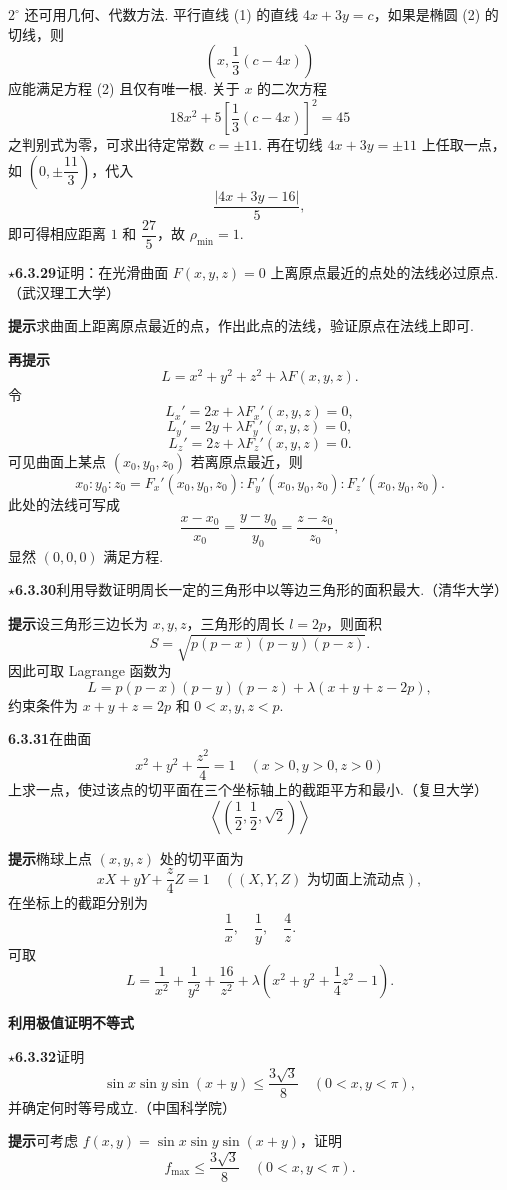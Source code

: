 \documentclass[UTF8,12pt,a4paper,fontset=fandol]{ctexart}
\begin{document}
$2^\circ$ 还可用几何、代数方法. 平行直线 (1) 的直线 $4x+3y=c$，如果是椭圆 (2) 的切线，则
\[
  \left(x,\frac13(c-4x)\right)
\]
应能满足方程 (2) 且仅有唯一根. 关于 $x$ 的二次方程
\[
  18x^2+5\left[\frac13(c-4x)\right]^2=45
\]
之判别式为零，可求出待定常数 $c=\pm11$. 再在切线 $4x+3y=\pm11$ 上任取一点，如 $\left(0,\pm\dfrac{11}{3}\right)$，代入
\[
  \frac{|4x+3y-16|}{5},
\]
即可得相应距离 $1$ 和 $\dfrac{27}{5}$，故 $\rho_{\min}=1$.

\noindent\textbf{\ensuremath{\star}6.3.29}\quad 证明：在光滑曲面 $F(x,y,z)=0$ 上离原点最近的点处的法线必过原点.（武汉理工大学）

\noindent\textbf{提示}\quad 求曲面上距离原点最近的点，作出此点的法线，验证原点在法线上即可.

\noindent\textbf{再提示}\quad
\[
  L=x^2+y^2+z^2+\lambda F(x,y,z).
\]
令
\[
  L_x'=2x+\lambda F_x'(x,y,z)=0,
\]
\[
  L_y'=2y+\lambda F_y'(x,y,z)=0,
\]
\[
  L_z'=2z+\lambda F_z'(x,y,z)=0.
\]
可见曲面上某点 $(x_0,y_0,z_0)$ 若离原点最近，则
\[
  x_0:y_0:z_0=F_x'(x_0,y_0,z_0):F_y'(x_0,y_0,z_0):F_z'(x_0,y_0,z_0).
\]
此处的法线可写成
\[
  \frac{x-x_0}{x_0}=\frac{y-y_0}{y_0}=\frac{z-z_0}{z_0},
\]
显然 $(0,0,0)$ 满足方程.

\noindent\textbf{\ensuremath{\star}6.3.30}\quad 利用导数证明周长一定的三角形中以等边三角形的面积最大.（清华大学）

\noindent\textbf{提示}\quad 设三角形三边长为 $x,y,z$，三角形的周长 $l=2p$，则面积
\[
  S=\sqrt{p(p-x)(p-y)(p-z)}.
\]
因此可取 Lagrange 函数为
\[
  L=p(p-x)(p-y)(p-z)+\lambda(x+y+z-2p),
\]
约束条件为 $x+y+z=2p$ 和 $0<x,y,z<p$.

\noindent\textbf{6.3.31}\quad 在曲面
\[
  x^2+y^2+\frac{z^2}{4}=1\quad(x>0,y>0,z>0)
\]
上求一点，使过该点的切平面在三个坐标轴上的截距平方和最小.（复旦大学）
\[
  \left\langle\left(\frac12,\frac12,\sqrt2\right)\right\rangle
\]

\noindent\textbf{提示}\quad 椭球上点 $(x,y,z)$ 处的切平面为
\[
  xX+yY+\frac{z}{4}Z=1\quad((X,Y,Z)\text{ 为切面上流动点}),
\]
在坐标上的截距分别为
\[
  \frac1x,\quad \frac1y,\quad \frac4z.
\]
可取
\[
  L=\frac1{x^2}+\frac1{y^2}+\frac{16}{z^2}
  +\lambda\left(x^2+y^2+\frac14z^2-1\right).
\]

\noindent\textbf{利用极值证明不等式}

\noindent\textbf{\ensuremath{\star}6.3.32}\quad 证明
\[
  \sin x\sin y\sin(x+y)\le\frac{3\sqrt3}{8}\quad(0<x,y<\pi),
\]
并确定何时等号成立.（中国科学院）

\noindent\textbf{提示}\quad 可考虑 $f(x,y)=\sin x\sin y\sin(x+y)$，证明
\[
  f_{\max}\le\frac{3\sqrt3}{8}\quad(0<x,y<\pi).
\]
\end{document}
